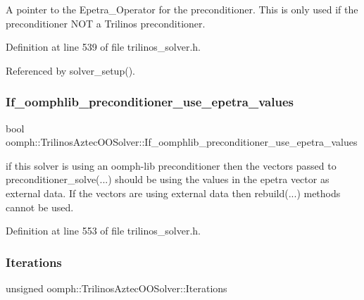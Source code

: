 A pointer to the Epetra\+\_\+\+Operator for the preconditioner. This is only used if the preconditioner N\+OT a Trilinos preconditioner. 



Definition at line 539 of file trilinos\+\_\+solver.\+h.



Referenced by solver\+\_\+setup().

\mbox{\label{classoomph_1_1TrilinosAztecOOSolver_a028992b1b3fe1a501590aa71d4a879e8}} 
\subsubsection{\texorpdfstring{If\+\_\+oomphlib\+\_\+preconditioner\+\_\+use\+\_\+epetra\+\_\+values}{If\_oomphlib\_preconditioner\_use\_epetra\_values}}
{\footnotesize\ttfamily bool oomph\+::\+Trilinos\+Aztec\+O\+O\+Solver\+::\+If\+\_\+oomphlib\+\_\+preconditioner\+\_\+use\+\_\+epetra\+\_\+values\hspace{0.3cm}{\ttfamily [protected]}}

if this solver is using an oomph-\/lib preconditioner then the vectors passed to preconditioner\+\_\+solve(...) should be using the values in the epetra vector as external data. If the vectors are using external data then rebuild(...) methods cannot be used. 

Definition at line 553 of file trilinos\+\_\+solver.\+h.

\mbox{\label{classoomph_1_1TrilinosAztecOOSolver_a26a9366d3ec0f11e7e907587c0439ea7}} 
\subsubsection{\texorpdfstring{Iterations}{Iterations}}
{\footnotesize\ttfamily unsigned oomph\+::\+Trilinos\+Aztec\+O\+O\+Solver\+::\+Iterations\hspace{0.3cm}{\ttfamily [protected]}}



